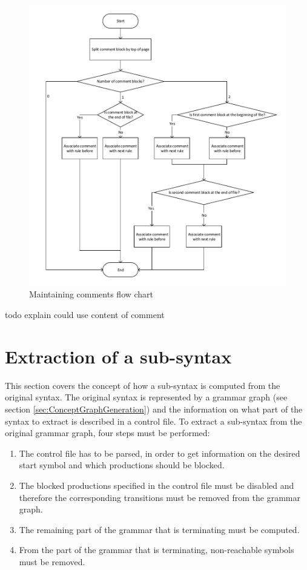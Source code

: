 \begin{figure}[H]
\centering
\includegraphics[width=1\textwidth]{images/Concept_maintaining_comments.pdf}
\caption{Maintaining comments flow chart}
\label{fig:ConceptMaintainingComments}
\end{figure}


todo explain could use content of comment

\section{Extraction of a sub-syntax}\label{sec:ConceptExtractReducedGrammar}
This section covers the concept of how a sub-syntax is computed from the original syntax.
The original syntax is represented by a grammar graph (see section \ref{sec:ConceptGraphGeneration}) and the information on what part of the syntax to extract is described in a control file.
To extract a sub-syntax from the original grammar graph, four steps must be performed:
\begin{enumerate}%
	\item The control file has to be parsed, in order to get information on the desired start symbol and which productions should be blocked.
	\item The blocked productions specified in the control file must be disabled and therefore the corresponding transitions must be removed from the grammar graph.
	\item The remaining part of the grammar that is terminating must be computed.
	\item From the part of the grammar that is terminating, non-reachable symbols must be removed.
\end{enumerate}
